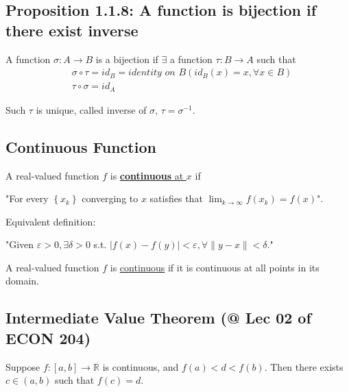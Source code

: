 \documentclass[11pt]{elegantbook}
\begin{document}
\subsection{Proposition 1.1.8: A function is bijection if there exist inverse}
\begin{proposition}[Proposition 1.1.8]
    A function $\sigma:A \rightarrow B$ is a bijection if $\exists$ a function $\tau:B \rightarrow A $ such that
    \begin{equation}
        \begin{aligned}
            &\sigma\circ\tau=id_B=\textit{identity on }B(id_B(x)=x, \forall x\in B)\\
            &\tau\circ\sigma=id_A
        \end{aligned}
        \nonumber
    \end{equation}
\end{proposition}
Such $\tau$ is unique, called inverse of $\sigma$, $\tau=\sigma^{-1}$.

\subsection{Continuous Function}
\begin{definition}
    \normalfont
    A real-valued function $f$ is \underline{\textbf{continuous} at $x$} if
    
    "For every $\left\{x_{k}\right\}$ converging to $x$ satisfies that $\lim _{k \rightarrow \infty} f\left(x_{k}\right)=f(x)$".

    Equivalent definition:
    
    "Given $\varepsilon>0, \exists \delta>0$ s.t.
    $|f(x)-f(y)|<\varepsilon, \forall\|y-x\|<\delta$."
\end{definition}
\begin{definition}
    \normalfont
    A real-valued function $f$ is \underline{continuous} if it is continuous at all points in its domain.
\end{definition}

\subsection{Intermediate Value Theorem \small{(@ Lec 02 of ECON 204)}}
\begin{theorem}
    Suppose $f : [a, b] \rightarrow \mathbb{R}$ is continuous, and $f(a) < d < f(b)$. Then there exists $c \in (a, b)$ such that $f(c) = d$.
\end{theorem}
\end{document}
